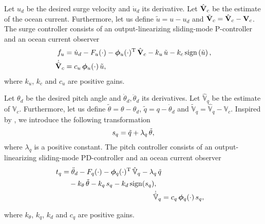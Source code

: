 Let $u_d$ be the desired surge velocity and $\dot{u}_d$ its derivative.
Let $\hat{\mathbf{V}}_c$ be the estimate of the ocean current.
Furthermore, let us define $\tilde{u} = u - u_d$ and $\tilde{\mathbf{V}}_c = \hat{\mathbf{V}}_c - \mathbf{V}_c$.
The surge controller consists of an output-linearizing sliding-mode P-controller and an ocean current observer \vspace{-1mm}
\begin{align}
    f_u &= \dot{u}_d - F_u(\cdot) - \bs{\phi}_u(\cdot)\T\,\oceanhat - k_u\,\tilde{u} - k_c\,{\rm sign}\left(\tilde{u}\right), \label{eq:nsb_5dof_t_u} \\
    \dot{\hat{\mat{V}}}_c &= c_u\,\bs{\phi}_u(\cdot)\,\tilde{u}, \label{eq:nsb_5dof_V_hat_u} \vspace{-2mm}
\end{align}
where $k_u$, $k_c$ and $c_u$ are positive gains.

Let $\theta_d$ be the desired pitch angle and $\dot{\theta}_d, \ddot{\theta}_d$ its derivatives.
Let $\hat{\mathbb{V}}_q$ be the estimate of $\mathbb{V}_c$.
Furthermore, let us define $\tilde{\theta} = \theta - \theta_d$, $\tilde{q} = q - \dot{\theta}_d$ and $\tilde{\mathbb{V}}_q = \hat{\mathbb{V}}_q - \mathbb{V}_c$.
Inspired by \cite{moe_set-based_2017}, we introduce the following transformation \vspace{-1.5mm}
\begin{equation}
    s_q = \tilde{q} + \lambda_q\,\tilde{\theta}, \vspace{-2mm}
\end{equation}
where $\lambda_q$ is a positive constant.
The pitch controller consists of an output-linearizing sliding-mode PD-controller and an ocean current observer \vspace{-1mm}
\begin{align}
    \begin{split}
        t_q &= \ddot{\theta}_d - F_q(\cdot) - \bm{\phi}_q(\cdot)^{\mathrm{T}}\,\hat{\mathbb{V}}_q - \lambda_q\,\tilde{q} \\
        & \quad - k_{\theta}\,\tilde{\theta} - k_q\,s_q - k_d\,{\rm sign}(s_q), 
    \end{split} \label{eq:nsb_5dof_t_q} \\
    \dot{\hat{\mathbb{V}}}_q &= c_q\,\bm{\phi}_q(\cdot)\,s_q, \label{eq:nsb_5dof_V_hat_q}
\end{align}
\vspace{-5.5mm}

\noindent where $k_{\theta}$, $k_q$, $k_d$ and $c_q$ are positive gains.

